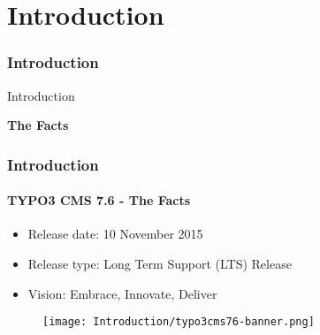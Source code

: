 %

\section{Introduction}
\begin{frame}[fragile]
	\frametitle{Introduction}

	\begin{center}\huge{Introduction}\end{center}
	\begin{center}\huge{\color{typo3darkgrey}\textbf{The Facts}}\end{center}

\end{frame}

\begin{frame}[fragile]
	\frametitle{Introduction}
	\framesubtitle{TYPO3 CMS 7.6 - The Facts}

	\begin{itemize}
		\item Release date: 10 November 2015
		\item Release type:
			\begingroup\color{red}Long Term Support (LTS) Release\endgroup
		\item Vision: Embrace, Innovate, Deliver
	\end{itemize}

	\begin{figure}
		\texttt{[image: Introduction/typo3cms76-banner.png]}
	\end{figure}

\end{frame}

